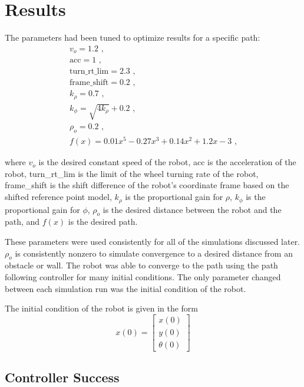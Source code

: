 \documentclass[11pt, letterpaper]{article}
\numberwithin{equation}{section}
\begin{document}
\pagebreak

\section{Results}
\label{sec:results}

The parameters had been tuned to optimize results for a specific path:
\begin{gather}
    v_o = 1.2 \text{ ,} \\
    \text{acc} = 1 \text{ ,} \\
    \text{turn\_rt\_lim} = 2.3 \text{ ,} \\
    \text{frame\_shift} = 0.2 \text{ ,} \\
    k_\rho = 0.7 \text{ ,} \\
    k_\phi = \sqrt{4 k_\rho} + 0.2 \text{ ,} \\
    \rho_o = 0.2 \text{ ,} \\
    f(x) = 0.01x^5 - 0.27x^3 + 0.14x^2 + 1.2x - 3 \text{ ,}
\end{gather}

where $v_o$ is the desired constant speed of the robot, acc is the acceleration of the robot, turn\_rt\_lim is the limit of the wheel turning rate of the robot, frame\_shift is the shift difference of the robot's coordinate frame based on the shifted reference point model, $k_\rho$ is the proportional gain for $\rho$, $k_\phi$ is the proportional gain for $\phi$, $\rho_o$ is the desired distance between the robot and the path, and $f(x)$ is the desired path.

These parameters were used consistently for all of the simulations discussed later. $\rho_o$ is consistently nonzero to simulate convergence to a desired distance from an obstacle or wall. The robot was able to converge to the path using the path following controller for many initial conditions. The only parameter changed between each simulation run was the initial condition of the robot.

The initial condition of the robot is given in the form
\begin{equation}
    x(0) = \begin{bmatrix} x(0) \\ y(0) \\ \theta(0) \end{bmatrix}
\end{equation}

\pagebreak

\subsection{Controller Success}
\end{document}
